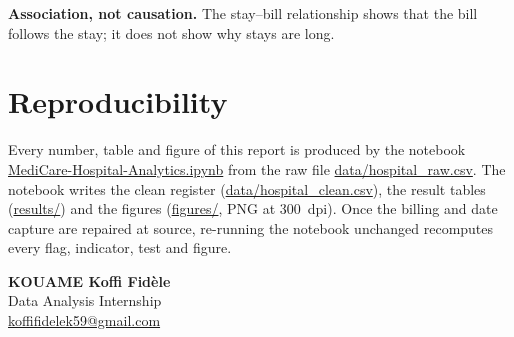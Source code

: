 \documentclass[12pt,a4paper]{article}
\newcommand{\F}[1]{{\small\url{#1}}}
\begin{document}
\textbf{Association, not causation.} The stay--bill relationship shows that the bill
follows the stay; it does not show why stays are long.

\section{Reproducibility}

Every number, table and figure of this report is produced by the notebook
\F{MediCare-Hospital-Analytics.ipynb} from the raw file \F{data/hospital_raw.csv}.
The notebook writes the clean register (\F{data/hospital_clean.csv}), the result
tables (\F{results/}) and the figures (\F{figures/}, PNG at 300~dpi). Once
the billing and date capture are repaired at source, re-running the notebook
unchanged recomputes every flag, indicator, test and figure.

\vspace{0.3cm}
\noindent\hfill\begin{minipage}{7cm}\begin{flushright}\singlespacing
\textbf{KOUAME Koffi Fid\`ele}\\
Data Analysis Internship\\
\href{mailto:koffifidelek59@gmail.com}{koffifidelek59@gmail.com}
\end{flushright}\end{minipage}
\end{document}
